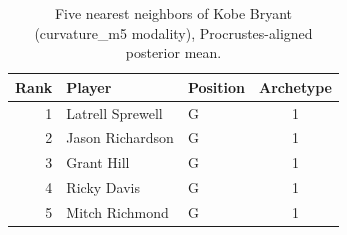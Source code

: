 \begin{table}[htbp]
  \centering\small
  \begin{tabular}{rllc}
    \toprule
    Rank & Player & Position & Archetype \\
    \midrule
    1 & Latrell Sprewell & G & 1 \\
    2 & Jason Richardson & G & 1 \\
    3 & Grant Hill & G & 1 \\
    4 & Ricky Davis & G & 1 \\
    5 & Mitch Richmond & G & 1 \\
    \bottomrule
  \end{tabular}
  \caption{Five nearest neighbors of Kobe Bryant (curvature_m5 modality), Procrustes-aligned posterior mean.}
  \label{tab:Kobe_Bryant_neighbors_curvature_m5}
\end{table}

